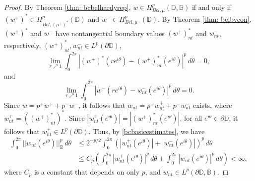 \documentclass[12pt,reqno]{amsart}
\theoremstyle{definition}
\theoremstyle{remark}
\newcommand{\p}{\partial}
\newcommand{\bc}{\mathbb{B}}
\newcommand{\disk}{\mathbb{D}}
\begin{document}
    \begin{proof}
        By Theorem \ref{thm: bcbelhardyrep}, $w \in H^p_{Bel,\mu}(\disk,\bc)$ if and only if $(w^+)^* \in H^p_{Bel, (\mu^+)^*}(\disk)$ and $w^- \in H^p_{Bel,\mu^-}(\disk)$. By Theorem \ref{thm: belbvcon}, $(w^+)^*$ and $w^-$ have nontangential boundary values $(w^+)^*_{nt}$ and $w^-_{nt}$, respectively, $(w^+)^*_{nt}, w^-_{nt} \in L^p(\p \disk)$,
        \begin{equation}\label{eqn: plusgoestozero}
                \lim_{r\nearrow 1} \int_0^{2\pi} |(w^+)^*(re^{i\theta})- (w^+)^*_{nt}(e^{i\theta})|^p \, d\theta = 0,
        \end{equation}
        and 
        \begin{equation}\label{eqn: minusgoestozero}
            \lim_{r\nearrow 1} \int_0^{2\pi} |w^-(re^{i\theta})- w^-_{nt}(e^{i\theta})|^p \, d\theta = 0.
        \end{equation}
        Since $w = p^+ w^+ + p^- w^-$, it follows that $w_{nt} = p^+ w^+_{nt} + p^- w^-_{nt}$ exists, where $w^+_{nt} = ((w^+)^*_{nt})^*$. Since $|w^+_{nt}(e^{i\theta})| = |(w^+)^*_{nt}(e^{i\theta})|$, for all $e^{i\theta} \in \p \disk$, it follows that $w^+_{nt} \in L^p(\p \disk)$. Thus, by \eqref{bcbasicestimates}, we have
        \begin{align*}
            \int_0^{2\pi} ||w_{nt}(e^{i\theta})||_{\bc}^p\,d\theta 
            &\leq 2^{-p/2}\int_0^{2\pi} \left( |w^+_{nt}(e^{i\theta})| + |w^-_{nt}(e^{i\theta})|\right)^p\,d\theta\\
            &\leq C_p \left(\int_0^{2\pi}  |w^+_{nt}(e^{i\theta})|^p \,d\theta + \int_0^{2\pi}  |w^-_{nt}(e^{i\theta})|^p\,d\theta  \right) < \infty,
        \end{align*}
        where $C_p$ is a constant that depends on only $p$, and $w_{nt} \in L^p(\p\disk,\bc)$. 


\end{proof}
\end{document}
